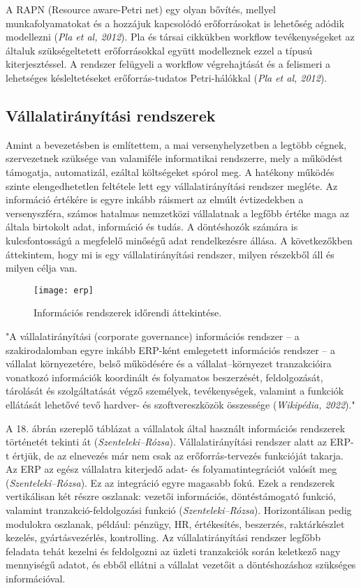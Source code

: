 \documentclass[12pt]{article}
\begin{document}
A RAPN (Resource aware-Petri net) egy olyan bővítés, mellyel munkafolyamatokat és a hozzájuk kapcsolódó erőforrásokat is lehetőség adódik modellezni (\textit{Pla et al, 2012}). Pla és társai cikkükben workflow tevékenységeket  az általuk szükségeltetett erőforrásokkal együtt modelleznek ezzel a típusú kiterjesztéssel. A rendszer felügyeli a workflow végrehajtását és a felismeri a lehetséges késleltetéseket erőforrás-tudatos Petri-hálókkal (\textit{Pla et al, 2012}).

\newpage
\subsection{Vállalatirányítási rendszerek}

Amint a bevezetésben is említettem, a mai versenyhelyzetben a legtöbb cégnek, szervezetnek szüksége van valamiféle informatikai rendszerre, mely a működést támogatja, automatizál, ezáltal költségeket spórol meg. A hatékony működés szinte elengedhetetlen feltétele lett egy vállalatirányítási rendszer megléte. Az információ értékére is egyre inkább ráismert az elmúlt évtizedekben a versenyszféra, számos hatalmas nemzetközi vállalatnak a legfőbb értéke maga az általa birtokolt adat, információ és tudás. A döntéshozók számára is kulcsfontosságú a megfelelő minőségű adat rendelkezésre állása. A következőkben áttekintem, hogy mi is egy vállalatirányítási rendszer, milyen részekből áll és milyen célja van.
\begin{figure}[h!]
\texttt{[image: erp]}
\caption{Információs rendszerek időrendi áttekintése.}
\end{figure}

"A vállalatirányítási (corporate governance) információs rendszer – a szakirodalomban egyre inkább ERP-ként emlegetett információs rendszer – a vállalat környezetére, belső működésére és a vállalat–környezet tranzakcióira vonatkozó információk koordinált és folyamatos beszerzését, feldolgozását, tárolását és szolgáltatását végző személyek, tevékenységek, valamint a funkciók ellátását lehetővé tevő hardver- és szoftvereszközök összessége (\textit{Wikipédia, 2022})."

A 18. ábrán szereplő táblázat a vállalatok által használt információs rendszerek történetét tekinti át (\textit{Szenteleki–Rózsa}). Vállalatirányítási rendszer alatt az ERP-t értjük, de az elnevezés már nem csak az erőforrás-tervezés funkcióját takarja. Az ERP az egész vállalatra kiterjedő adat- és folyamatintegrációt valósít meg (\textit{Szenteleki–Rózsa}). Ez az integráció egyre magasabb fokú. Ezek a rendszerek vertikálisan két részre oszlanak: vezetői információs, döntéstámogató funkció, valamint tranzakció-feldolgozási funkció (\textit{Szenteleki–Rózsa}). Horizontálisan pedig modulokra oszlanak, például: pénzügy, HR, értékesítés, beszerzés, raktárkészlet kezelés, gyártásvezérlés, kontrolling. Az vállalatirányítási rendszer legfőbb feladata tehát kezelni és feldolgozni az üzleti tranzakciók során keletkező nagy mennyiségű adatot, és ebből ellátni a vállalat vezetőit a döntéshozáshoz szükséges információval.
\end{document}
